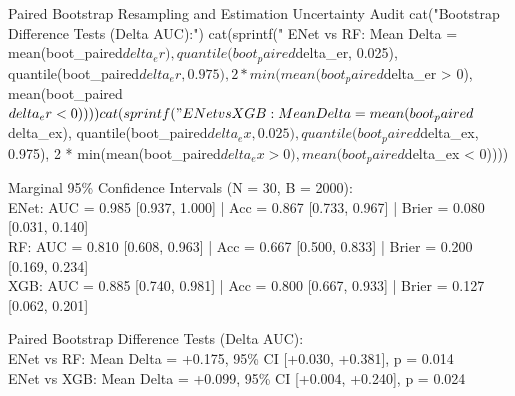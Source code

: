 \documentclass[11pt,oneside]{book}
\begin{document}
\begin{rchunk}{Paired Bootstrap Resampling and Estimation Uncertainty Audit}
cat("\nPaired Bootstrap Difference Tests (Delta AUC):\n")
cat(sprintf("  ENet vs RF:  Mean Delta = %
            mean(boot_paired$delta_er), quantile(boot_paired$delta_er, 0.025), quantile(boot_paired$delta_er, 0.975),
            2 * min(mean(boot_paired$delta_er > 0), mean(boot_paired$delta_er < 0))))
cat(sprintf("  ENet vs XGB: Mean Delta = %
            mean(boot_paired$delta_ex), quantile(boot_paired$delta_ex, 0.025), quantile(boot_paired$delta_ex, 0.975),
            2 * min(mean(boot_paired$delta_ex > 0), mean(boot_paired$delta_ex < 0))))
\end{rchunk}

\begin{routput}
Marginal 95\% Confidence Intervals (N = 30, B = 2000):\\
\hspace*{2em}ENet: AUC = 0.985 [0.937, 1.000] | Acc = 0.867 [0.733, 0.967] | Brier = 0.080 [0.031, 0.140]\\
\hspace*{2em}RF:   AUC = 0.810 [0.608, 0.963] | Acc = 0.667 [0.500, 0.833] | Brier = 0.200 [0.169, 0.234]\\
\hspace*{2em}XGB:  AUC = 0.885 [0.740, 0.981] | Acc = 0.800 [0.667, 0.933] | Brier = 0.127 [0.062, 0.201]

Paired Bootstrap Difference Tests (Delta AUC):\\
\hspace*{2em}ENet vs RF:  Mean Delta = +0.175, 95\% CI [+0.030, +0.381], p = 0.014\\
\hspace*{2em}ENet vs XGB: Mean Delta = +0.099, 95\% CI [+0.004, +0.240], p = 0.024
\end{routput}
\end{document}
